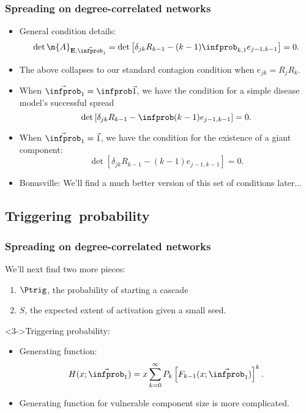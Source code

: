 \begin{frame}
  \frametitle{Spreading on degree-correlated networks}

  \begin{itemize}
  \item<1-> General condition details:
    $$
    \det{\m{A}_{\mathbf{E},\vec{\infprob}_1}}
    =
    \det
    \left[
      \delta_{jk} R_{k-1} 
      -
      (k-1) \infprob_{k,1} e_{j-1,k-1}
    \right] = 0.
    $$
  \item<2->
    The above collapses to our standard
    contagion condition when $e_{jk} = R_j R_k$.
  \item<3->
    When $\vec{\infprob}_1=\infprob \vec{1}$, we have the condition
    for a simple disease model's successful spread
    $$
    \det
    \left[
      \delta_{jk} R_{k-1} 
      -
      \infprob (k-1)   e_{j-1,k-1}
    \right] = 0.
    $$
  \item<4-> 
    When $\vec{\infprob}_1=\vec{1}$, we have the condition
    for the existence of a giant component:
    $$
    \det
    \left[
      \delta_{jk} R_{k-1} 
      -
      (k-1) e_{j-1,k-1}
    \right] = 0.
    $$
  \item<5->
    Bonusville: We'll find a much better
    version of this set of conditions later...
  \end{itemize}

\end{frame}

\subsection{Triggering\ probability}

\begin{frame}
  \frametitle{Spreading on degree-correlated networks}

  \begin{block}{We'll next find two more pieces:}
    \begin{enumerate}
    \item<1-> 
      $\Ptrig$, the probability of starting a cascade
    \item<2->
      $S$, the expected extent of activation given
      a small seed.
    \end{enumerate}

    \begin{block}<3->{Triggering probability:}
      \begin{itemize}
      \item 
        Generating function:
        $$
        H(x;\vec{\infprob}_1)
        = 
        x
        \sum_{k=0}^\infty
        P_k
        \left[
          F_{k-1}(x;\vec{\infprob}_1)
        \right]^k.
        $$
      \item<4->
        Generating function for vulnerable
        component size is more complicated.
      \end{itemize}
    \end{block}
    
  \end{block}

\end{frame}


